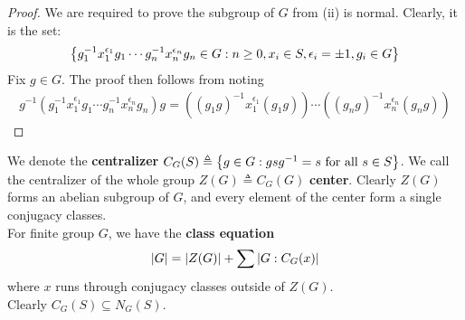\documentclass{report}
\begin{document}
\begin{proof}
We are required to prove the subgroup of $G$ from (ii) is normal. Clearly, it is the set:
\begin{align*}
\left\{ g_1^{-1}x_1^{\epsilon _1}g_1 \cdots g_n^{-1}x_n^{\epsilon_n}g_n \in G: n\geq 0,x_i \in S,\epsilon_i =\pm 1, g_i \in G  \right\}
\end{align*}
Fix $g \in G$. The proof then follows from noting
\begin{align*}
g^{-1}\left(g_1^{-1}x_1^{\epsilon _1}g_1 \cdots g_n^{-1}x_n^{\epsilon_n}g_n\right)g= \left( \left(g_1g\right)^{-1}x_1 ^{\epsilon _1} \left(g _1g  \right) \right) \cdots   \left( \left(g _ng\right)^{-1}x_n ^{\epsilon _n} \left(g_ng  \right) \right) 
\end{align*}
\end{proof}

We denote the \textbf{centralizer} $C_G(S)\triangleq \left\{ g \in G: gsg^{-1}=s\text{ for all }s \in S \right\}$. We call the centralizer of the whole group $Z(G)\triangleq C_G(G)$ \textbf{center}. Clearly $Z(G)$ forms an abelian subgroup of $G$, and every element of the center form a single conjugacy classes.     \\

For finite group $G$, we have the \textbf{class equation}
\begin{align*}
 \left|G\right| = \left|Z(G)\right|+ \sum \left|G: C_G(x)\right|
\end{align*}
\label{THce}
where $x$ runs through conjugacy classes outside of  $Z(G)$. \\





Clearly $C_G(S)\subseteq N_G(S)$. 
\end{document}
